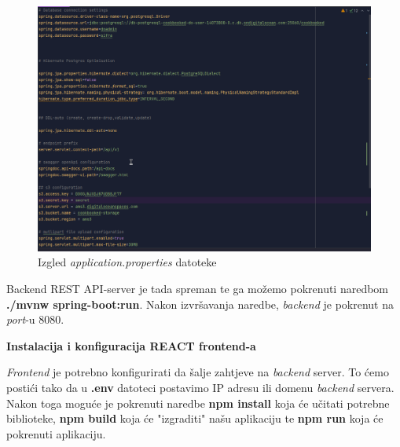 			\begin{figure}[H]
				\includegraphics[scale=0.4]{slike/app_prop.png}
				\centering
				\caption{Izgled \textit{application.properties} datoteke}
				\label{fig:approp}
			\end{figure}


			\noindent Backend REST API-server je tada spreman te ga možemo pokrenuti naredbom
			\textbf{./mvnw spring-boot:run}. Nakon izvršavanja naredbe, \textit{backend} je pokrenut na
			\textit{port}-u 8080.

			\eject
			\noindent \textbf{Instalacija i konfiguracija REACT frontend-a}

			\noindent \textit{Frontend} je potrebno konfigurirati da šalje zahtjeve na \textit{backend} server.
			To ćemo postići tako da u \textbf{.env} datoteci postavimo IP adresu ili domenu \textit{backend}
			servera. Nakon toga moguće je pokrenuti naredbe \textbf{npm install} koja će učitati
			potrebne biblioteke, \textbf{npm build} koja će "izgraditi" našu aplikaciju te \textbf{npm run}
			koja će pokrenuti aplikaciju. 
		
		
			\eject 